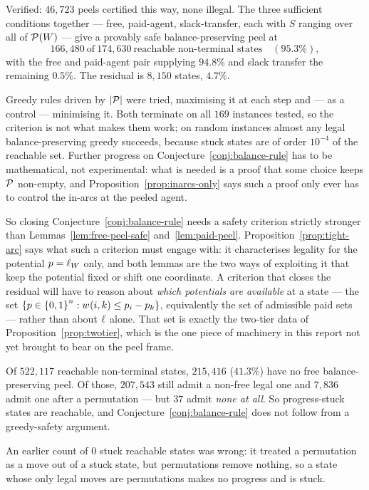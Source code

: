 Verified: $46{,}723$ peels certified this way, none illegal. The three sufficient
conditions together --- free, paid-agent, slack-transfer, each with $S$ ranging
over all of $\mathcal{P}(W)$ --- give a provably safe
balance-preserving peel at
\[
  166{,}480 \ \text{of} \ 174{,}630 \ \text{reachable non-terminal states}
  \quad (95.3\%),
\]
with the free and paid-agent pair supplying $94.8\%$ and slack transfer the
remaining $0.5\%$. The residual is $8{,}150$ states, $4.7\%$.

\begin{remark}
\label{rem:testing-exhausted}
Greedy rules driven by $\left\lvert\mathcal{P}\right\rvert$ were tried, maximising it at each step
and --- as a control --- minimising it. Both terminate on all $169$ instances
tested, so the criterion is not what makes them work; on random instances almost
any legal balance-preserving greedy succeeds, because stuck states are of order
$10^{-4}$ of the reachable set. Further progress on
Conjecture~\ref{conj:balance-rule} has to be mathematical, not experimental:
what is needed is a proof that some choice keeps $\mathcal{P}$ non-empty, and
Proposition~\ref{prop:inarcs-only} says such a proof only ever has to control the
in-arcs at the peeled agent.
\end{remark}

So closing Conjecture~\ref{conj:balance-rule} needs a safety criterion strictly
stronger than Lemmas~\ref{lem:free-peel-safe} and~\ref{lem:paid-peel}.
Proposition~\ref{prop:tight-arc} says what such a criterion must engage with: it
characterises legality for the potential $p = \ell_{W}$ only, and both
lemmas are the two ways of exploiting it that keep the potential fixed or shift
one coordinate. A criterion that closes the residual will have to reason about
\emph{which potentials are available} at a state --- the set
$\left\{p \in \left\{0,1\right\}^n : w_{}(i,k) \le p_i - p_k\right\}$, equivalently the set of
admissible paid sets --- rather than about $\ell_{}$ alone. That set is exactly
the two-tier data of Proposition~\ref{prop:twotier}, which is the one piece of
machinery in this report not yet brought to bear on the peel frame.

\begin{observation}
\label{obs:peel-residual}
Of $522{,}117$ reachable non-terminal states, $215{,}416$ ($41.3\%$) have no free
balance-preserving peel. Of those, $207{,}543$ still admit a non-free legal one
and $7{,}836$ admit one after a permutation --- but $37$ admit \emph{none at
all}. So progress-stuck states are reachable, and
Conjecture~\ref{conj:balance-rule} does not follow from a greedy-safety argument.

An earlier count of $0$ stuck reachable states was wrong: it treated a
permutation as a move out of a stuck state, but permutations remove nothing, so a
state whose only legal moves are permutations makes no progress and is stuck.
\end{observation}

